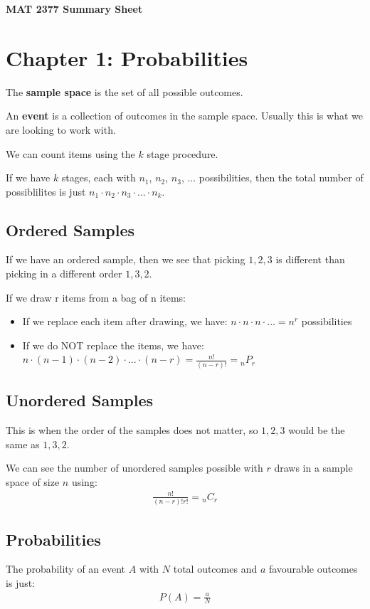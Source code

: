 \documentclass[12pt,letterpaper]{article} \usepackage{amsmath} \usepackage{graphicx} \usepackage[margin=1in]{geometry} \usepackage{longtable}  \usepackage{amssymb}
\begin{document}
	
	\begin{center}
		\Large\textbf{MAT 2377 Summary Sheet} \\
		\vspace{0.5em}
	\end{center}
	
	\section{Chapter 1: Probabilities}
	The \textbf{sample space} is the set of all possible outcomes. 
	
	An \textbf{event} is a collection of outcomes in the sample space. Usually this is what we are looking to work with. 
	
	We can count items using the $k$ stage procedure. 
	
	If we have $k$ stages, each with $n_1$, $n_2$, $n_3$, ... possibilities, then the total number of possiblilites is just $n_1\cdot n_2\cdot n_3\cdot ...\cdot n_k$.
	
	\subsection{Ordered Samples}
	If we have an ordered sample, then we see that picking $1, 2, 3$ is different than picking in a different order $1, 3, 2$.
	
	If we draw r items from a bag of n items:
	\begin{itemize}[]
		\item If we replace each item after drawing, we have: $n\cdot n\cdot n\cdot ... = n^r$ possibilities
		\item If we do NOT replace the items, we have: $n\cdot (n-1)\cdot (n-2)\cdot ...\cdot (n-r) = \frac{n!}{(n-r)!}= {}_nP_r$
	\end{itemize}
	
	\subsection{Unordered Samples}
	This is when the order of the samples does not matter, so $1,2,3$ would be the same as $1,3,2$. 
	
	We can see the number of unordered samples possible with $r$ draws in a sample space of size $n$ using:
	\begin{align*}
		\frac{n!}{(n-r)!r!} = {}_nC_r
	\end{align*}
	
	\subsection{Probabilities}
	The probability of an event $A$ with $N$ total outcomes and $a$ favourable outcomes is just:
	\begin{align*}
		P(A) = \frac{a}{N}
	\end{align*}
	
\end{document}
